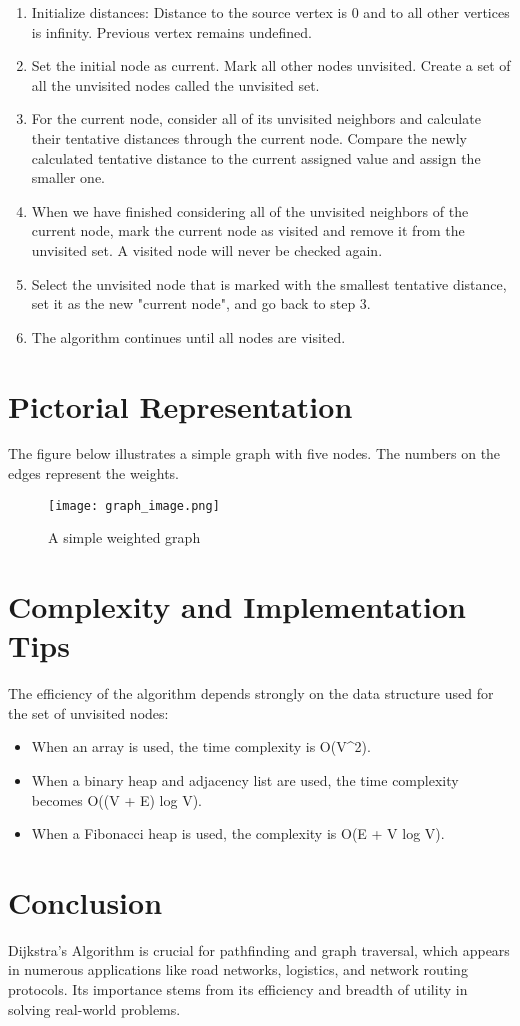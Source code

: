 \documentclass{article}
\begin{document}
\begin{enumerate}
    \item Initialize distances: Distance to the source vertex is 0 and to all other vertices is infinity. Previous vertex remains undefined.
    \item Set the initial node as current. Mark all other nodes unvisited. Create a set of all the unvisited nodes called the unvisited set.
    \item For the current node, consider all of its unvisited neighbors and calculate their tentative distances through the current node. Compare the newly calculated tentative distance to the current assigned value and assign the smaller one.
    \item When we have finished considering all of the unvisited neighbors of the current node, mark the current node as visited and remove it from the unvisited set. A visited node will never be checked again.
    \item Select the unvisited node that is marked with the smallest tentative distance, set it as the new "current node", and go back to step 3.
    \item The algorithm continues until all nodes are visited.
\end{enumerate}

\section{Pictorial Representation}

The figure below illustrates a simple graph with five nodes. The numbers on the edges represent the weights.

\begin{figure}[h]
\centering
\texttt{[image: graph\_image.png]} %
\caption{A simple weighted graph}
\end{figure}

\section{Complexity and Implementation Tips}

The efficiency of the algorithm depends strongly on the data structure used for the set of unvisited nodes:
\begin{itemize}
    \item When an array is used, the time complexity is O(V^2).
    \item When a binary heap and adjacency list are used, the time complexity becomes O((V + E) log V).
    \item When a Fibonacci heap is used, the complexity is O(E + V log V).
\end{itemize}

\section{Conclusion}

Dijkstra’s Algorithm is crucial for pathfinding and graph traversal, which appears in numerous applications like road networks, logistics, and network routing protocols. Its importance stems from its efficiency and breadth of utility in solving real-world problems.
\end{document}
